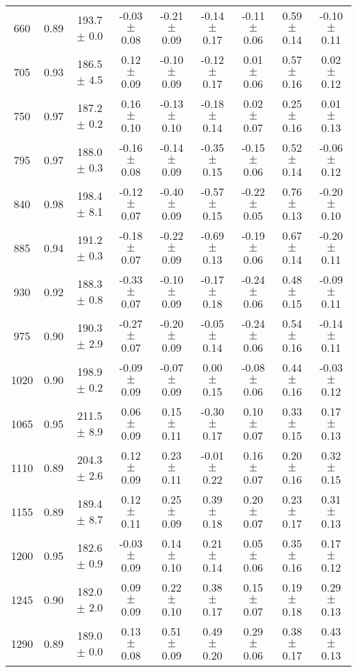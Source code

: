 \documentclass[twocolumn]{aastex61}%
\begin{document}
\begin{table*}
\begin{tabular}{ccc|ccccc|c}
660 & 0.89 & 193.7 $\pm$ 0.0 & -0.03 $\pm$ 0.08 & -0.21 $\pm$ 0.09 & -0.14 $\pm$ 0.17 & -0.11 $\pm$ 0.06 & 0.59 $\pm$ 0.14 & -0.10 $\pm$ 0.11\\
705 & 0.93 & 186.5 $\pm$ 4.5 & 0.12 $\pm$ 0.09 & -0.10 $\pm$ 0.09 & -0.12 $\pm$ 0.17 & 0.01 $\pm$ 0.06 & 0.57 $\pm$ 0.16 & 0.02 $\pm$ 0.12\\
750 & 0.97 & 187.2 $\pm$ 0.2 & 0.16 $\pm$ 0.10 & -0.13 $\pm$ 0.10 & -0.18 $\pm$ 0.14 & 0.02 $\pm$ 0.07 & 0.25 $\pm$ 0.16 & 0.01 $\pm$ 0.13\\
795 & 0.97 & 188.0 $\pm$ 0.3 & -0.16 $\pm$ 0.08 & -0.14 $\pm$ 0.09 & -0.35 $\pm$ 0.15 & -0.15 $\pm$ 0.06 & 0.52 $\pm$ 0.14 & -0.06 $\pm$ 0.12\\
840 & 0.98 & 198.4 $\pm$ 8.1 & -0.12 $\pm$ 0.07 & -0.40 $\pm$ 0.09 & -0.57 $\pm$ 0.15 & -0.22 $\pm$ 0.05 & 0.76 $\pm$ 0.13 & -0.20 $\pm$ 0.10\\
885 & 0.94 & 191.2 $\pm$ 0.3 & -0.18 $\pm$ 0.07 & -0.22 $\pm$ 0.09 & -0.69 $\pm$ 0.13 & -0.19 $\pm$ 0.06 & 0.67 $\pm$ 0.14 & -0.20 $\pm$ 0.11\\
930 & 0.92 & 188.3 $\pm$ 0.8 & -0.33 $\pm$ 0.07 & -0.10 $\pm$ 0.09 & -0.17 $\pm$ 0.18 & -0.24 $\pm$ 0.06 & 0.48 $\pm$ 0.15 & -0.09 $\pm$ 0.11\\
975 & 0.90 & 190.3 $\pm$ 2.9 & -0.27 $\pm$ 0.07 & -0.20 $\pm$ 0.09 & -0.05 $\pm$ 0.14 & -0.24 $\pm$ 0.06 & 0.54 $\pm$ 0.16 & -0.14 $\pm$ 0.11\\
1020 & 0.90 & 198.9 $\pm$ 0.2 & -0.09 $\pm$ 0.09 & -0.07 $\pm$ 0.09 & 0.00 $\pm$ 0.15 & -0.08 $\pm$ 0.06 & 0.44 $\pm$ 0.16 & -0.03 $\pm$ 0.12\\
1065 & 0.95 & 211.5 $\pm$ 8.9 & 0.06 $\pm$ 0.09 & 0.15 $\pm$ 0.11 & -0.30 $\pm$ 0.17 & 0.10 $\pm$ 0.07 & 0.33 $\pm$ 0.15 & 0.17 $\pm$ 0.13\\
1110 & 0.89 & 204.3 $\pm$ 2.6 & 0.12 $\pm$ 0.09 & 0.23 $\pm$ 0.11 & -0.01 $\pm$ 0.22 & 0.16 $\pm$ 0.07 & 0.20 $\pm$ 0.16 & 0.32 $\pm$ 0.15\\
1155 & 0.89 & 189.4 $\pm$ 8.7 & 0.12 $\pm$ 0.11 & 0.25 $\pm$ 0.09 & 0.39 $\pm$ 0.18 & 0.20 $\pm$ 0.07 & 0.23 $\pm$ 0.17 & 0.31 $\pm$ 0.13\\
1200 & 0.95 & 182.6 $\pm$ 0.9 & -0.03 $\pm$ 0.09 & 0.14 $\pm$ 0.10 & 0.21 $\pm$ 0.14 & 0.05 $\pm$ 0.06 & 0.35 $\pm$ 0.16 & 0.17 $\pm$ 0.12\\
1245 & 0.90 & 182.0 $\pm$ 2.0 & 0.09 $\pm$ 0.09 & 0.22 $\pm$ 0.10 & 0.38 $\pm$ 0.17 & 0.15 $\pm$ 0.07 & 0.19 $\pm$ 0.18 & 0.29 $\pm$ 0.13\\
1290 & 0.89 & 189.0 $\pm$ 0.0 & 0.13 $\pm$ 0.08 & 0.51 $\pm$ 0.09 & 0.49 $\pm$ 0.20 & 0.29 $\pm$ 0.06 & 0.38 $\pm$ 0.17 & 0.43 $\pm$ 0.13\\

\end{tabular}
\end{table*}
\end{document}

